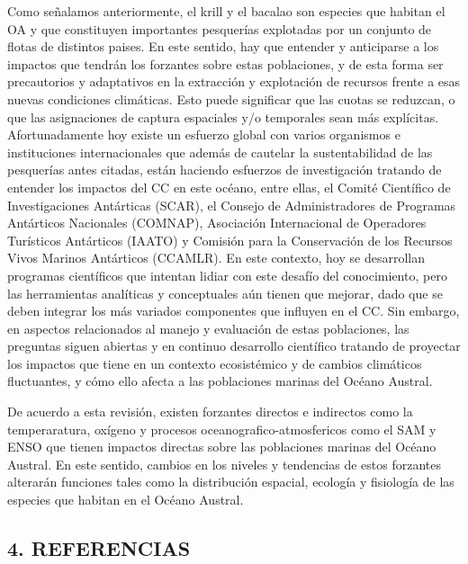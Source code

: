 \documentclass[
]{article}
\begin{document}
Como señalamos anteriormente, el krill y el bacalao son especies que
habitan el OA y que constituyen importantes pesquerías explotadas por un
conjunto de flotas de distintos paises. En este sentido, hay que
entender y anticiparse a los impactos que tendrán los forzantes sobre
estas poblaciones, y de esta forma ser precautorios y adaptativos en la
extracción y explotación de recursos frente a esas nuevas condiciones
climáticas. Esto puede significar que las cuotas se reduzcan, o que las
asignaciones de captura espaciales y/o temporales sean más explícitas.
Afortunadamente hoy existe un esfuerzo global con varios organismos e
instituciones internacionales que además de cautelar la sustentabilidad
de las pesquerías antes citadas, están haciendo esfuerzos de
investigación tratando de entender los impactos del CC en este océano,
entre ellas, el Comité Científico de Investigaciones Antárticas (SCAR),
el Consejo de Administradores de Programas Antárticos Nacionales
(COMNAP), Asociación Internacional de Operadores Turísticos Antárticos
(IAATO) y Comisión para la Conservación de los Recursos Vivos Marinos
Antárticos (CCAMLR). En este contexto, hoy se desarrollan programas
científicos que intentan lidiar con este desafío del conocimiento, pero
las herramientas analíticas y conceptuales aún tienen que mejorar, dado
que se deben integrar los más variados componentes que influyen en el
CC. Sin embargo, en aspectos relacionados al manejo y evaluación de
estas poblaciones, las preguntas siguen abiertas y en continuo
desarrollo científico tratando de proyectar los impactos que tiene en un
contexto ecosistémico y de cambios climáticos fluctuantes, y cómo ello
afecta a las poblaciones marinas del Océano Austral.

De acuerdo a esta revisión, existen forzantes directos e indirectos como
la temperaratura, oxígeno y procesos oceanografico-atmosfericos como el
SAM y ENSO que tienen impactos directas sobre las poblaciones marinas
del Océano Austral. En este sentido, cambios en los niveles y tendencias
de estos forzantes alterarán funciones tales como la distribución
espacial, ecología y fisiología de las especies que habitan en el Océano
Austral.

\pagebreak

\hypertarget{referencias}{%
\subsection*{4. REFERENCIAS}\label{referencias}}
\end{document}
